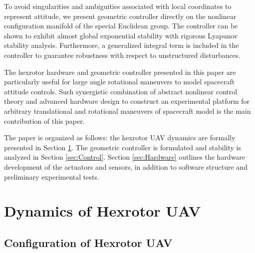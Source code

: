 \documentclass[twocolumn,letterpaper]{IEEEAerospaceCLS}  %
\begin{document}
To avoid singularities and ambiguities associated with local coordinates to represent attitude, we present geometric controller directly on the nonlinear configuration manifold of the special Euclidean group. %
The controller can be shown to exhibit almost global exponential stability with rigorous Lyapunov stability analysis. Furthermore, a generalized integral term is included in the controller to guarantee robustness with respect to unstructured disturbances.

The hexrotor hardware and geometric controller presented in this paper are particularly useful for large angle rotational maneuvers to model spacecraft attitude controls. Such synergistic combination of abstract nonlinear control theory and advanced hardware design to construct an experimental platform for arbitrary translational and rotational maneuvers of spacecraft model is the main contribution of this paper. 

The paper is organized as follows: the hexrotor UAV dynamics are formally presented in Section \ref{sec:Dynamics}.
The geometric controller is formulated and stability is analyzed in Section \ref{sec:Control}.
Section \ref{sec:Hardware} outlines the hardware development of the actuators and sensors, in addition to software structure and preliminary experimental tests.




\section{Dynamics of Hexrotor UAV}\label{sec:Dynamics}

\subsection{Configuration of Hexrotor UAV}
\end{document}
